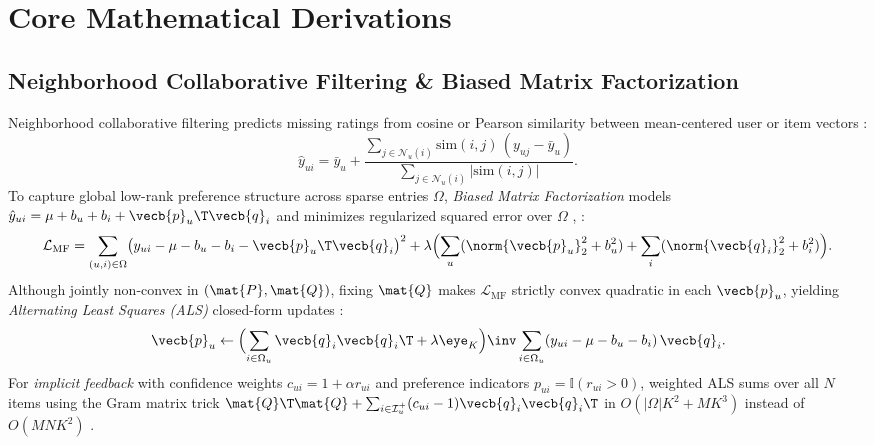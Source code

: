 \documentclass[../../../../master.tex]{subfiles}
\begin{document}
\section{Core Mathematical Derivations}

\subsection{Neighborhood Collaborative Filtering \& Biased Matrix Factorization}

\begin{coremath}
Neighborhood collaborative filtering predicts missing ratings from cosine or Pearson similarity between mean-centered user or item vectors :
\begin{equation}
  \hat{y}_{ui} = \bar{y}_u + \frac{\sum_{j \in \mathcal{N}_u(i)} \mathrm{sim}(i, j)\,(y_{uj} - \bar{y}_u)}{\sum_{j \in \mathcal{N}_u(i)} |\mathrm{sim}(i, j)|}.
\end{equation}
To capture global low-rank preference structure across sparse entries $\Omega$, \emph{Biased Matrix Factorization} models $\hat{y}_{ui} = \mu + b_u + b_i + \vecb{p}_u\T \vecb{q}_i$ and minimizes regularized squared error over $\Omega$ , :
\begin{equation}
  \mathcal{L}_{\mathrm{MF}} = \sum_{(u,i)\in\Omega} \bigl(y_{ui} - \mu - b_u - b_i - \vecb{p}_u\T \vecb{q}_i\bigr)^2 + \lambda\Bigl(\sum_u (\norm{\vecb{p}_u}_2^2 + b_u^2) + \sum_i (\norm{\vecb{q}_i}_2^2 + b_i^2)\Bigr).
\end{equation}
Although jointly non-convex in $(\mat{P}, \mat{Q})$, fixing $\mat{Q}$ makes $\mathcal{L}_{\mathrm{MF}}$ strictly convex quadratic in each $\vecb{p}_u$, yielding \emph{Alternating Least Squares (ALS)} closed-form updates :
\begin{equation}
  \vecb{p}_u \gets \Bigl(\sum_{i \in \Omega_u} \vecb{q}_i \vecb{q}_i\T + \lambda \eye_K\Bigr)\inv \sum_{i \in \Omega_u} (y_{ui} - \mu - b_u - b_i)\,\vecb{q}_i.
\end{equation}
For \emph{implicit feedback} with confidence weights $c_{ui} = 1 + \alpha r_{ui}$ and preference indicators $p_{ui} = \mathbb{I}(r_{ui} > 0)$, weighted ALS sums over all $N$ items using the Gram matrix trick $\mat{Q}\T\mat{Q} + \sum_{i \in \mathcal{I}_u^+} (c_{ui}-1)\vecb{q}_i\vecb{q}_i\T$ in $O(|\Omega| K^2 + M K^3)$ instead of $O(MNK^2)$ .
\end{coremath}
\end{document}
